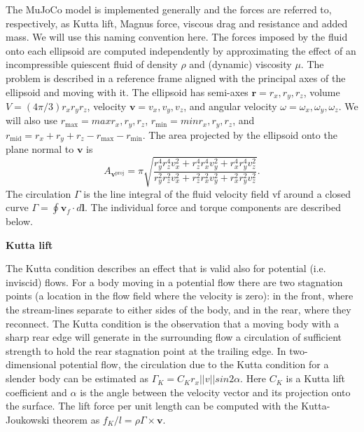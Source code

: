 \documentclass[sn-mathphys-num]{sn-jnl}%
\theoremstyle{thmstyleone}	%
\theoremstyle{thmstyletwo}	%
\theoremstyle{thmstylethree}	%
\begin{document}
\begin{appendices}
The MuJoCo model is implemented generally and the forces are referred to, respectively, as Kutta lift, Magnus force, viscous drag and resistance and added mass. 
We will use this naming convention here. 
The forces imposed by the fluid onto each ellipsoid are computed independently by approximating the effect of an incompressible quiescent fluid of density $ \rho $ and (dynamic) viscosity $ \mu $. 
The problem is described in a reference frame aligned with the principal axes of the ellipsoid and moving with it. 
The ellipsoid has semi-axes $ \mathbf{r} = {r_x, r_y, r_z} $, volume $ V = (4 \pi / 3) r_x r_y r_z $, velocity $ \mathbf{v} = {v_x, v_y, v_z} $, and angular velocity $ \omega = {\omega_x, \omega_y, \omega_z} $. 
We will also use $ r_\text{max} = max {r_x, r_y, r_z} $, $ r_\text{min} = min{r_x, r_y, r_z} $, and $ r_\text{mid} = r_x + r_y + r_z - r_\text{max} - r_\text{min} $. 
The area projected by the ellipsoid onto the plane normal to $ \mathbf{v} $ is
%
\begin{equation}\label{eq:projected_eare}
	A_{\mathbf{v}^\text{proj}} = 
		\pi
		\sqrt{
			\frac{
				r_y^4 r_z^4 v_x^2 +
				r_z^4 r_x^4 v_y^2 +
				r_x^4 r_y^4 v_z^2
			}{
				r_y^2 r_z^2 v_x^2 +
				r_z^2 r_x^2 v_y^2 +
				r_x^2 r_y^2 v_z^2
			}
		}.
\end{equation}
%
The circulation $ \Gamma $ is the line integral of the fluid velocity field vf around a closed curve $ \Gamma = \oint \mathbf{v}_f \cdot d\mathbf{l} $. 
The individual force and torque components are described below.


\textbf{Kutta lift}

The Kutta condition describes an effect that is valid also for potential (i.e. inviscid) flows. 
For a body moving in a potential flow there are two stagnation points (a location in the flow field where the velocity is zero): 
in the front, where the stream-lines separate to either sides of the body, 
and in the rear, where they reconnect. 
The Kutta condition is the observation that a moving body with a sharp rear edge will generate in the surrounding flow a circulation of sufficient strength to hold the rear stagnation point at the trailing edge. 
In two-dimensional potential flow, the circulation due to the Kutta condition for a slender body can be estimated as $ \Gamma_K = C_K r_x || v || sin 2\alpha $. 
Here $ C_K $ is a Kutta lift coefficient and $ \alpha $ is the angle between the velocity vector and its projection onto the surface. 
The lift force per unit length can be computed with the Kutta-Joukowski theorem as $ f_K / l = \rho \Gamma \times \mathbf{v} $.



\end{appendices}
\end{document}
